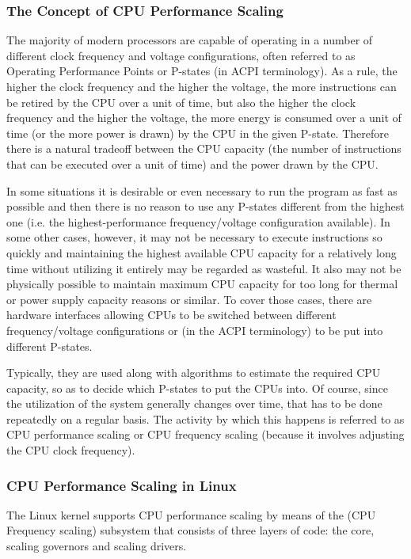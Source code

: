 \documentclass[a4paper,8pt,english]{sphinxmanual}
\begin{document}
\subsubsection{The Concept of CPU Performance Scaling}
\label{admin-guide/pm/cpufreq:the-concept-of-cpu-performance-scaling}
The majority of modern processors are capable of operating in a number of
different clock frequency and voltage configurations, often referred to as
Operating Performance Points or P-states (in ACPI terminology).  As a rule,
the higher the clock frequency and the higher the voltage, the more instructions
can be retired by the CPU over a unit of time, but also the higher the clock
frequency and the higher the voltage, the more energy is consumed over a unit of
time (or the more power is drawn) by the CPU in the given P-state.  Therefore
there is a natural tradeoff between the CPU capacity (the number of instructions
that can be executed over a unit of time) and the power drawn by the CPU.

In some situations it is desirable or even necessary to run the program as fast
as possible and then there is no reason to use any P-states different from the
highest one (i.e. the highest-performance frequency/voltage configuration
available).  In some other cases, however, it may not be necessary to execute
instructions so quickly and maintaining the highest available CPU capacity for a
relatively long time without utilizing it entirely may be regarded as wasteful.
It also may not be physically possible to maintain maximum CPU capacity for too
long for thermal or power supply capacity reasons or similar.  To cover those
cases, there are hardware interfaces allowing CPUs to be switched between
different frequency/voltage configurations or (in the ACPI terminology) to be
put into different P-states.

Typically, they are used along with algorithms to estimate the required CPU
capacity, so as to decide which P-states to put the CPUs into.  Of course, since
the utilization of the system generally changes over time, that has to be done
repeatedly on a regular basis.  The activity by which this happens is referred
to as CPU performance scaling or CPU frequency scaling (because it involves
adjusting the CPU clock frequency).


\subsubsection{CPU Performance Scaling in Linux}
\label{admin-guide/pm/cpufreq:cpu-performance-scaling-in-linux}
The Linux kernel supports CPU performance scaling by means of the 
(CPU Frequency scaling) subsystem that consists of three layers of code: the
core, scaling governors and scaling drivers.
\end{document}

